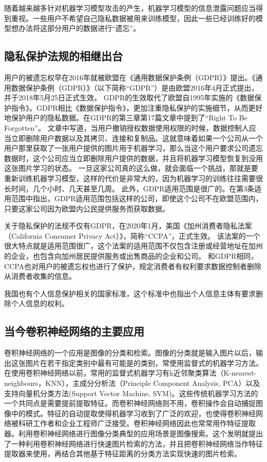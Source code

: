 随着越来越多针对机器学习模型攻击的产生，机器学习模型的信息泄露问题应当得到重视。一些用户不希望自己隐私数据被用来训练模型，因此一些已经训练好的模型想办法将这部分用户的数据进行“遗忘”。
\subsection{隐私保护法规的相继出台}
用户的被遗忘权早在2016年就被欧盟在《通用数据保护条例（GDPR）》提出。《通用数据保护条例（GDPR）》\cite{gdpr2018}（以下简称“GDPR”）是由欧盟2016年4月正式提出，并于2018年5月25日正式生效。
GDPR的生效取代了欧盟自1995年实施的《数据保护指令》。GDPR相比《数据保护指令》，更加注重隐私保护的实施细节，从而更好地保护用户的隐私数据。在GDPR的第三章第17篇文章中提到了“Right To Be Forgotten”。
文章中写道，当用户撤销授权数据使用权限的时候，数据控制人应当立即删除用户数据以及其拷贝、连接和复制品。这就意味着如果一个公司从一个用户那里获取了一张用户提供的图片用于机器学习，那么当这个用户要求公司遗忘数据时，这个公司应当立即删除用户提供的数据，并且将机器学习模型恢复到没用这张图片学习的状态。
一旦这家公司真的这么做，就会面临一个挑战，那就是要重新训练机器学习模型，这样的代价是非常大的，因为机器学习的训练往往需要很长时间，几个小时、几天甚至几周。
此外，GDPR适用范围是很广的。在第3条适用范围中指出，GDPR适用范围包括这样的公司，即使这个公司不在欧盟范围内，只要这家公司因为欧盟内公民提供服务而获取数据。

关于隐私保护的法规不仅有GDPR，在2020年1月，美国《加州消费者隐私法案（California Consumer Privacy Act）》\cite{ccpa2020}，简称“CCPA”，正式生效。
该法案的一个很大特点就是适用范围很广，这个法案的适用范围不仅包含注册或经营地址在加州的企业，也包含向加州居民提供服务或出售商品的企业和公司\cite{jiahui2020}。
和GDPR相同，CCPA也对用户的被遗忘权也进行了保护，规定消费者有权利要求数据控制者删除从消费者收集的信息。

我国也有个人信息保护相关的国家标准\cite{gbt35273}，这个标准中也指出个人信息主体有要求删除个人信息的权利。

\subsection{当今卷积神经网络的主要应用}
卷积神经网络的一个应用是图像的分类和检索。图像的分类就是输入图片以后，输出这张图片在若干指定类别中最有可能是的类别，常使用监督式的机器学习方法。在使用卷积神经网络以前，常用的监督式机器学习有k近邻聚类算法（K-nearest-neighbours，KNN），主成分分析法（Principle Component Analysis, PCA）以及支持向量机分类方法(Support Vector Machine, SVM)\cite{zhouzhihua2016}。这些传统机器学习方法的一个共同点是需要提前提取特征。而卷积神经网络则不用，卷积操作会自动捕捉图像中的模式。特征的自动提取使得机器学习收到了广泛的欢迎，也使得卷积神经网络被科研工作者和企业工程师广泛接受。卷积神经网络因此也常常用作特征提取器。利用卷积神经网络进行图像分类典型的应用场景是图像搜索。这个发明\cite{lingqiang2016}就提出了一种利用卷积神经网络进行快速图片检索的方法，并且把卷积神经网络当作特征提取器来使用，再结合其他基于特征距离的分类方法实现快速的图片检索。

